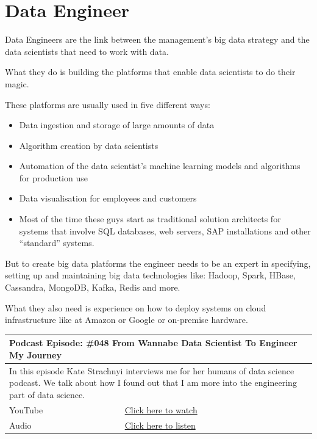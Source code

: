 \documentclass[12pt, numbers=noenddot]{scrreprt} %
\begin{document}
\section{Data Engineer}
Data Engineers are the link between the management’s big data strategy and the data scientists that need to work with data.

What they do is building the platforms that enable data scientists to do their magic.

These platforms are usually used in five different ways:

\begin{itemize}
\item  Data ingestion and storage of large amounts of data
\item Algorithm creation by data scientists
\item Automation of the data scientist’s machine learning models and algorithms for production use
\item Data visualisation for employees and customers
\item  Most of the time these guys start as traditional solution architects for systems that involve SQL databases, web servers, SAP installations and other “standard” systems.
\end{itemize}

But to create big data platforms the engineer needs to be an expert in specifying, setting up and maintaining big data technologies like: Hadoop, Spark, HBase, Cassandra, MongoDB, Kafka, Redis and more.

What they also need is experience on how to deploy systems on cloud infrastructure like at Amazon or Google or on-premise hardware.

\begin{table}[h]
\begin{tabular}{ll}
\hline
\multicolumn{2}{l}{\textbf{Podcast Episode:} \#048 From Wannabe Data Scientist To Engineer My Journey} \\ \hline
\multicolumn{2}{p{15cm}}{In this episode Kate Strachnyi interviews me for her humans of data science podcast. We talk about how I found out that I am more into the engineering part of data science.}         \\ \hline
\multicolumn{1}{l|}{YouTube}   & \href{https://youtu.be/pIZkTuN5AMM}{Click here to watch}   \\
\multicolumn{1}{l|}{Audio}     & \href{https://anchor.fm/andreaskayy/episodes/048-From-Wannabe-Data-Scientist-To-Engineer-My-Journey-e45i2o}{Click here to listen}   \\ \hline
\end{tabular}
\end{table}
\end{document}

